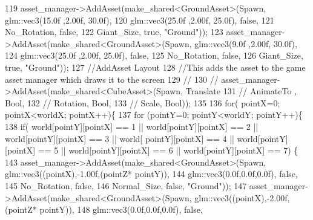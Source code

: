 \begin{DoxyCode}
119         asset\_manager->AddAsset(make\_shared<GroundAsset>(Spawn, glm::vec3(15.0f ,2.00f, 30.0f),
120                                                          glm::vec3(25.0f ,2.00f, 25.0f), \textcolor{keyword}{false},
121                                                          No\_Rotation, \textcolor{keyword}{false},
122                                                          Giant\_Size, \textcolor{keyword}{true}, \textcolor{stringliteral}{"Ground"}));
123         asset\_manager->AddAsset(make\_shared<GroundAsset>(Spawn, glm::vec3(9.0f ,2.00f, 30.0f),
124                                                          glm::vec3(25.0f ,2.00f, 25.0f), \textcolor{keyword}{false},
125                                                          No\_Rotation, \textcolor{keyword}{false},
126                                                          Giant\_Size, \textcolor{keyword}{true}, \textcolor{stringliteral}{"Ground"}));
127    \textcolor{comment}{//AddAsset Layout }
128    \textcolor{comment}{//This adds the asset to the game asset manager which draws it to the screen}
129    \textcolor{comment}{//}
130    \textcolor{comment}{//  asset\_manager->AddAsset(make\_shared<CubeAsset>(Spawn, Translate}
131    \textcolor{comment}{//                                                 AnimateTo , Bool,}
132    \textcolor{comment}{//                                                 Rotation, Bool,}
133    \textcolor{comment}{//                                                 Scale, Bool));  }
135 \textcolor{comment}{}
136   \textcolor{keywordflow}{for}( pointX=0; pointX<worldX; pointX++)\{
137    \textcolor{keywordflow}{for} (pointY=0; pointY<worldY; pointY++)\{
138     \textcolor{keywordflow}{if}( world[pointY][pointX] == 1 || world[pointY][pointX] == 2 || world[pointY][pointX] == 3 || world[
      pointY][pointX] == 4 || world[pointY][pointX] == 5 || world[pointY][pointX] == 6 || world[pointY][pointX] == 7)
      \{          
143             asset\_manager->AddAsset(make\_shared<GroundAsset>(Spawn, glm::vec3((pointX),-1.00f,(pointZ*
      pointY)),
144                                                              glm::vec3(0.0f,0.0f,0.0f), \textcolor{keyword}{false},
145                                                              No\_Rotation, \textcolor{keyword}{false},
146                                                              Normal\_Size, \textcolor{keyword}{false}, \textcolor{stringliteral}{"Ground"}));
147             asset\_manager->AddAsset(make\_shared<GroundAsset>(Spawn, glm::vec3((pointX),-2.00f,(pointZ*
      pointY)),
148                                                              glm::vec3(0.0f,0.0f,0.0f), \textcolor{keyword}{false},

\end{DoxyCode}
